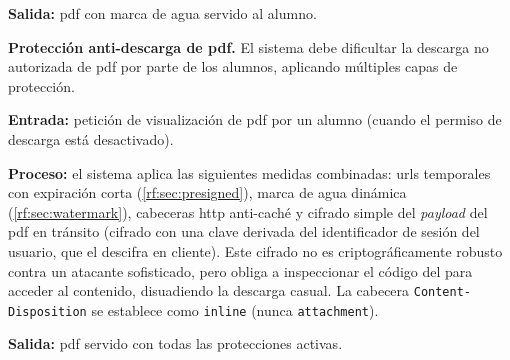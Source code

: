 \begin{functional}
    \textbf{Salida:} \acs{pdf} con marca de agua servido al alumno.

    \item \textbf{Protección anti-descarga de \acs{pdf}.}
    \label{rf:sec:anti_download}
    El sistema debe dificultar la descarga no autorizada de \acs{pdf} por parte de los
    alumnos, aplicando múltiples capas de protección.

    \textbf{Entrada:} petición de visualización de \acs{pdf} por un alumno (cuando el
    permiso de descarga está desactivado).

    \textbf{Proceso:} el sistema aplica las siguientes medidas combinadas: \acsp{url}
    temporales con expiración corta (\cref{rf:sec:presigned}), marca de agua dinámica
    (\cref{rf:sec:watermark}), cabeceras \acs{http} anti-caché y cifrado simple del
    \textit{payload} del \acs{pdf} en tránsito (cifrado con una clave derivada del
    identificador de sesión del usuario, que el  descifra en cliente). Este
    cifrado no es criptográficamente robusto contra un atacante sofisticado, pero obliga a
    inspeccionar el código del  para acceder al contenido, disuadiendo la
    descarga casual. La cabecera \texttt{Content-Disposition} se establece como
    \texttt{inline} (nunca \texttt{attachment}).

    \textbf{Salida:} \acs{pdf} servido con todas las protecciones activas.

\end{functional}
